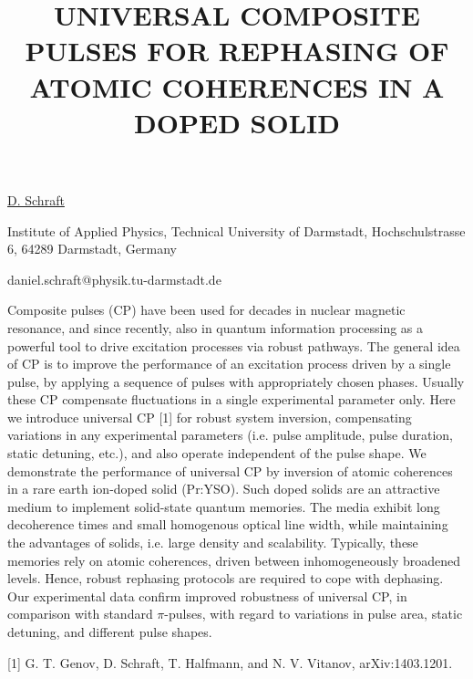 \title{UNIVERSAL COMPOSITE PULSES FOR REPHASING OF ATOMIC COHERENCES IN A DOPED SOLID}

\underline{D. Schraft} 

{\normalsize{\vspace{-4mm}}
Institute of Applied Physics, Technical University of Darmstadt, Hochschulstrasse 6, 64289 Darmstadt, Germany

\email daniel.schraft@physik.tu-darmstadt.de}

Composite pulses (CP) have been used for decades in nuclear magnetic resonance, and since recently, also in quantum information processing as a powerful tool to drive excitation processes via robust pathways. The general idea of CP is to improve the performance of an excitation process driven by a single pulse, by applying a sequence of pulses with appropriately chosen phases. Usually these CP compensate fluctuations in a single experimental parameter only. Here we introduce universal CP [1] for robust system inversion, compensating variations in any experimental parameters (i.e. pulse amplitude, pulse duration, static detuning, etc.), and also operate independent of the pulse shape.
We demonstrate the performance of universal CP by inversion of atomic coherences in a rare earth ion-doped solid (Pr:YSO). Such doped solids are an attractive medium to implement solid-state quantum memories. The media exhibit long decoherence times and small homogenous optical line width, while maintaining the advantages of solids, i.e. large density and scalability. Typically, these memories rely on atomic coherences, driven between inhomogeneously broadened levels. Hence, robust rephasing protocols are required to cope with dephasing. Our experimental data confirm improved robustness of universal CP, in comparison with standard $\pi$-pulses, with regard to variations in pulse area, static detuning, and different pulse shapes.

{\normalsize
[1] G. T. Genov, D. Schraft, T. Halfmann, and N. V. Vitanov, arXiv:1403.1201.
}

\vspace{\baselineskip}
